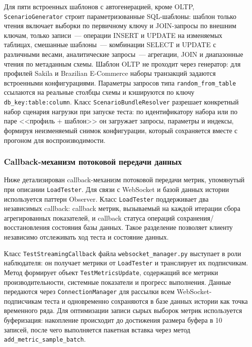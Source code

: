 Для пяти встроенных шаблонов с автогенерацией, кроме OLTP, \texttt{ScenarioGenerator} строит параметризованные SQL-шаблоны: шаблон только чтения включает выборки по первичному ключу и JOIN-запросы по внешним ключам, только записи~--- операции INSERT и UPDATE на изменяемых таблицах, смешанные шаблоны~--- комбинации SELECT и UPDATE с различными весами, аналитические запросы~--- агрегации, JOIN и диапазонные чтения по метаданным схемы. Шаблон OLTP не проходит через генератор: для профилей Sakila и Brazilian E-Commerce наборы транзакций задаются встроенными конфигурациями. Параметры запросов типа \texttt{random\_from\_table} ссылаются на реальные столбцы схемы и кэшируются по ключу \texttt{db\_key:table:column}. Класс \texttt{ScenarioBundleResolver} разрешает конкретный набор сценария нагрузки при запуске теста: по идентификатору набора или по паре <<профиль + шаблон>> он загружает запросы, параметры и индексы, формируя неизменяемый снимок конфигурации, который сохраняется вместе с прогоном для воспроизводимости.

\subsubsection{Callback-механизм потоковой передачи данных}

Ниже детализирован callback-механизм потоковой передачи метрик, упомянутый при описании \texttt{LoadTester}. Для связи с WebSocket и базой данных истории используется паттерн Observer. Класс \texttt{LoadTester} поддерживает два независимых callback: callback метрик, вызываемый на каждой итерации сбора агрегированных показателей, и callback статуса операций сохранения/восстановления состояния базы данных. Такое разделение позволяет клиенту независимо отслеживать ход теста и состояние данных.

Класс \texttt{TestStreamingCallback} файла \texttt{websocket\_manager.py} выступает в роли наблюдателя: он получает метрики от \texttt{LoadTester} и транслирует их подписчикам. Метод формирует объект \texttt{TestMetricsUpdate}, содержащий все метрики производительности, системные показатели и прогресс выполнения. Данные передаются через \texttt{ConnectionManager} для рассылки всем WebSocket-подписчикам теста и одновременно сохраняются в базе данных истории как точка временного ряда. Для оптимизации записи сырых выборок метрик используется буферизация: накопление происходит до достижения размера буфера в 10 записей, после чего выполняется пакетная вставка через метод \texttt{add\_metric\_sample\_batch}.

